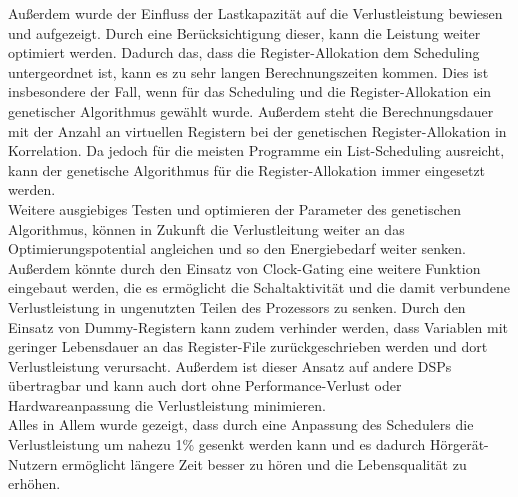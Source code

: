 Außerdem wurde der Einfluss der Lastkapazität auf die Verlustleistung bewiesen und aufgezeigt. Durch eine Berücksichtigung dieser, kann die Leistung weiter optimiert werden.
Dadurch das, dass die Register-Allokation dem Scheduling untergeordnet ist, kann es zu sehr langen Berechnungszeiten kommen. Dies ist insbesondere der Fall, wenn für das Scheduling und die Register-Allokation ein genetischer Algorithmus gewählt wurde. Außerdem steht die Berechnungsdauer mit der Anzahl an virtuellen Registern bei der genetischen Register-Allokation in Korrelation. Da jedoch für die meisten Programme ein List-Scheduling ausreicht, kann der genetische Algorithmus für die Register-Allokation immer eingesetzt werden.\\
Weitere ausgiebiges Testen und optimieren der Parameter des genetischen Algorithmus, können in Zukunft die Verlustleitung weiter an das Optimierungspotential angleichen und so den Energiebedarf weiter senken. Außerdem könnte durch den Einsatz von Clock-Gating eine weitere Funktion eingebaut werden, die es ermöglicht die Schaltaktivität und die damit verbundene Verlustleistung in ungenutzten Teilen des Prozessors zu senken. Durch den Einsatz von Dummy-Registern kann zudem verhinder werden, dass Variablen mit geringer Lebensdauer an das Register-File zurückgeschrieben werden und dort Verlustleistung verursacht. Außerdem ist dieser Ansatz auf andere DSPs übertragbar und kann auch dort ohne Performance-Verlust oder Hardwareanpassung die Verlustleistung minimieren.\\
Alles in Allem wurde gezeigt, dass durch eine Anpassung des Schedulers die Verlustleistung um nahezu 1\% gesenkt werden kann und es dadurch Hörgerät-Nutzern ermöglicht längere Zeit besser zu hören und die Lebensqualität zu erhöhen.\\
%


